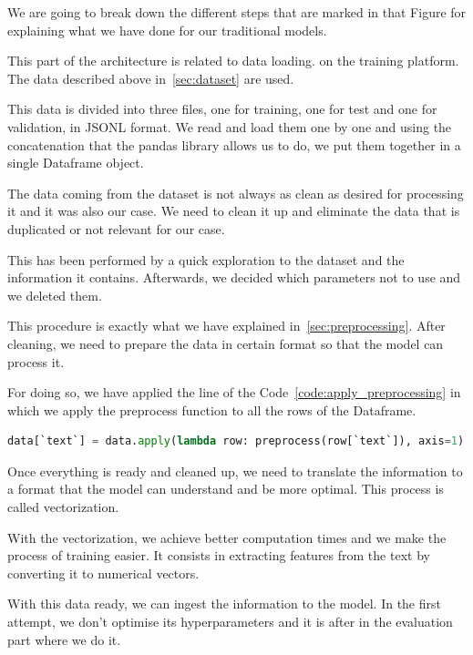 We are going to break down the different steps that are marked in that Figure for explaining what we have done for our traditional models.

This part of the architecture is related to data loading. on the training platform. The data described above in~\ref{sec:dataset} are used.

This data is divided into three files, one for training, one for test and one for validation, in JSONL format. We read and load them one by one and using the concatenation that the pandas library allows us to do, we put them together in a single Dataframe object.

The data coming from the dataset is not always as clean as desired for processing it and it was also our case. We need to clean it up and eliminate the data that is duplicated or not relevant for our case.

This has been performed by a quick exploration to the dataset and the information it contains. Afterwards, we decided which parameters not to use and we deleted them.

This procedure is exactly what we have explained in~\ref{sec:preprocessing}. After cleaning, we need to prepare the data in certain format so that the model can process it. 

For doing so, we have applied the line of the Code~\ref{code:apply_preprocessing} in which we apply the preprocess function to all the rows of the Dataframe.

\begin{lstlisting}[language=Python, caption={Preprocessing application}, label={code:apply_preprocessing}]
data[`text`] = data.apply(lambda row: preprocess(row[`text`]), axis=1)
\end{lstlisting}

Once everything is ready and cleaned up, we need to translate the information to a format that the model can understand and be more optimal. This process is called vectorization.

With the vectorization, we achieve better computation times and we make the process of training easier. It consists in extracting features from the text by converting it to numerical vectors.

With this data ready, we can ingest the information to the model. In the first attempt, we don't optimise its hyperparameters and it is after in the evaluation part where we do it.

